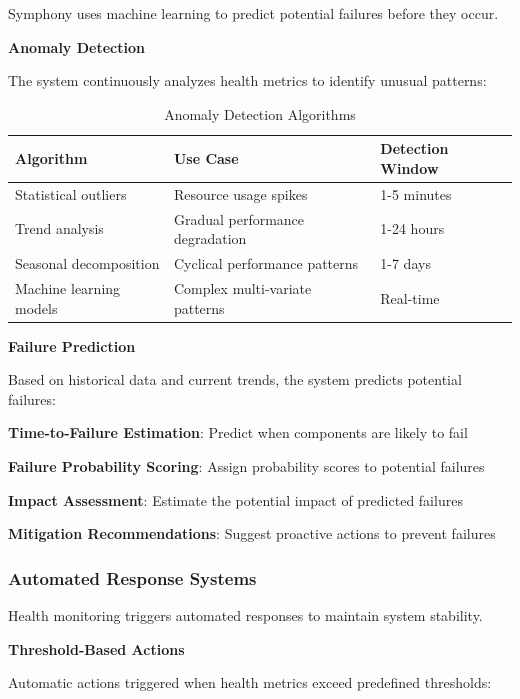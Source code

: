 Symphony uses machine learning to predict potential failures before they occur.

\textbf{Anomaly Detection}

The system continuously analyzes health metrics to identify unusual patterns:

\begin{table}[h]
\centering
\caption{Anomaly Detection Algorithms}
\label{tab:anomaly-detection}
\begin{tabular}{@{}lll@{}}
\toprule
\textbf{Algorithm} & \textbf{Use Case} & \textbf{Detection Window} \\
\midrule
Statistical outliers & Resource usage spikes & 1-5 minutes \\
Trend analysis & Gradual performance degradation & 1-24 hours \\
Seasonal decomposition & Cyclical performance patterns & 1-7 days \\
Machine learning models & Complex multi-variate patterns & Real-time \\
\bottomrule
\end{tabular}
\end{table}

\textbf{Failure Prediction}

Based on historical data and current trends, the system predicts potential failures:

\begin{compactlist}
    \item \textbf{Time-to-Failure Estimation}: Predict when components are likely to fail
    \item \textbf{Failure Probability Scoring}: Assign probability scores to potential failures
    \item \textbf{Impact Assessment}: Estimate the potential impact of predicted failures
    \item \textbf{Mitigation Recommendations}: Suggest proactive actions to prevent failures
\end{compactlist}

\subsubsection{Automated Response Systems}

Health monitoring triggers automated responses to maintain system stability.

\textbf{Threshold-Based Actions}

Automatic actions triggered when health metrics exceed predefined thresholds:

